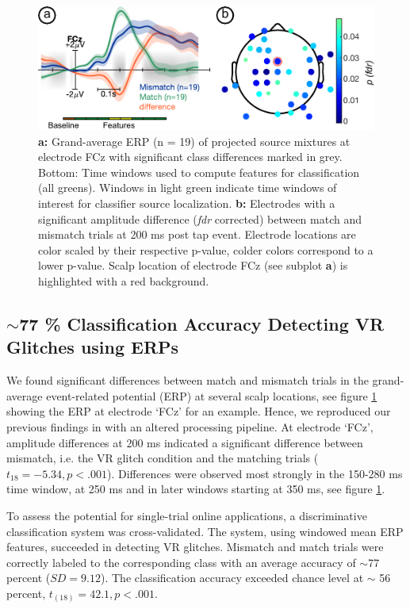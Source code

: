 
\begin{figure}[h]
  \includegraphics[width=.7\textwidth]{figures/erp_FCZ_diff_delay_with_scalp_map.pdf}
  \caption{\textbf{a:} Grand-average ERP (n = 19) of projected source mixtures at electrode FCz with significant class differences marked in grey. Bottom: Time windows used to compute features for classification (all greens). Windows in light green indicate time windows of interest for classifier source localization. \textbf{b:} Electrodes with a significant amplitude difference (\textit{fdr} corrected) between match and mismatch trials at 200 ms post tap event. Electrode locations are color scaled by their respective p-value, colder colors correspond to a lower p-value. Scalp location of electrode FCz (see subplot \textbf{a}) is highlighted with a red background.}
  \label{erp}
\end{figure}

\subsection{$\sim$77 \% Classification Accuracy Detecting VR Glitches using ERPs}

We found significant differences between match and mismatch trials in the grand-average event-related potential (ERP) at several scalp locations, see figure \ref{erp} showing the ERP at electrode `FCz' for an example. Hence, we reproduced our previous findings in \cite{Gehrke2019-og} with an altered processing pipeline. At electrode `FCz', amplitude differences at 200 ms indicated a significant difference between mismatch, i.e. the VR glitch condition and the matching trials ($t_{18} = -5.34, p < .001$). Differences were observed most strongly in the 150-280 ms time window, at 250 ms and in later windows starting at 350 ms, see figure \ref{erp}.

To assess the potential for single-trial online applications, a discriminative classification system was cross-validated. The system, using windowed mean ERP features, succeeded in detecting VR glitches. Mismatch and match trials were correctly labeled to the corresponding class with an average accuracy of $\sim$77 percent ($SD = 9.12$). The classification accuracy exceeded chance level at $\sim$ 56 percent, $t_{(18)} = 42.1, p < .001$. 

